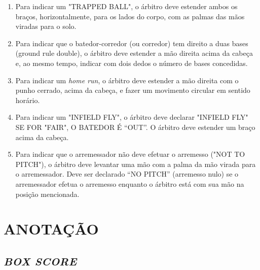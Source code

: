 \begin{multicols}{2}
\begin{enumerate}[label=\alph*)]
		\item  Para indicar um "TRAPPED BALL", o árbitro deve estender ambos os braços, horizontalmente, para os lados do corpo, com as palmas das mãos viradas para o solo. 
		
		\item  Para indicar que o batedor-corredor (ou corredor) tem direito a duas bases (\gls{ground rule double}), o árbitro deve estender a mão direita acima da cabeça e, ao mesmo tempo, indicar com dois dedos o número de bases concedidas. 
		
		\item  Para indicar um \textit{home run}, o árbitro deve estender a mão direita com o punho cerrado, acima da cabeça, e fazer um movimento circular em sentido horário. 
		
		\item  Para indicar um "INFIELD FLY", o árbitro deve declarar "INFIELD FLY" SE FOR "FAIR", O BATEDOR É “OUT”. O árbitro deve estender um braço acima da cabeça. 
		
		\item Para indicar que o arremessador não deve efetuar o arremesso ("NOT TO PITCH"), o árbitro deve levantar uma mão com a palma da mão virada para o arremessador. Deve ser declarado “NO PITCH” (arremesso nulo) se o arremessador efetua o arremesso enquanto o árbitro está com sua mão na posição mencionada. 
	\end{enumerate}
\end{multicols}

\chapter{ANOTAÇÃO }

\section{\textit{BOX SCORE}}

